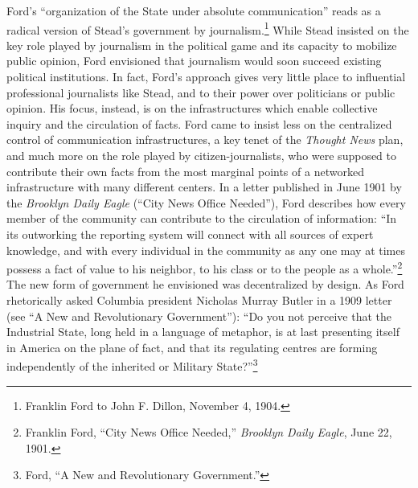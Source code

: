 \documentclass[openany,nobib]{tufte-book}
\begin{document}
Ford's ``organization of the State under absolute communication'' reads
as a radical version of Stead's government by journalism.\footnote{Franklin
  Ford to John F. Dillon, November 4, 1904.} While Stead insisted on the
key role played by journalism in the political game and its capacity to
mobilize public opinion, Ford envisioned that journalism would soon
succeed existing political institutions. In fact, Ford's approach gives
very little place to influential professional journalists like Stead,
and to their power over politicians or public opinion. His focus,
instead, is on the infrastructures which enable collective inquiry and
the circulation of facts. Ford came to insist less on the centralized
control of communication infrastructures, a key tenet of the
\emph{Thought News} plan, and much more on the role played by
citizen-journalists, who were supposed to contribute their own facts
from the most marginal points of a networked infrastructure with many
different centers. In a letter published in June 1901 by the
\emph{Brooklyn Daily Eagle} (``City News Office Needed''), Ford
describes how every member of the community can contribute to the
circulation of information: ``In its outworking the reporting system
will connect with all sources of expert knowledge, and with every
individual in the community as any one may at times possess a fact of
value to his neighbor, to his class or to the people as a
whole.''\footnote{Franklin Ford, ``City News Office Needed,''
  \emph{Brooklyn Daily Eagle}, June 22, 1901.} The new form of
government he envisioned was decentralized by design. As Ford
rhetorically asked Columbia president Nicholas Murray Butler in a 1909
letter (see ``A New and Revolutionary Government''): ``Do you not
perceive that the Industrial State, long held in a language of metaphor,
is at last presenting itself in America on the plane of fact, and that
its regulating centres are forming independently of the inherited or
Military State?''\footnote{Ford, ``A New and Revolutionary Government.''}
\end{document}
